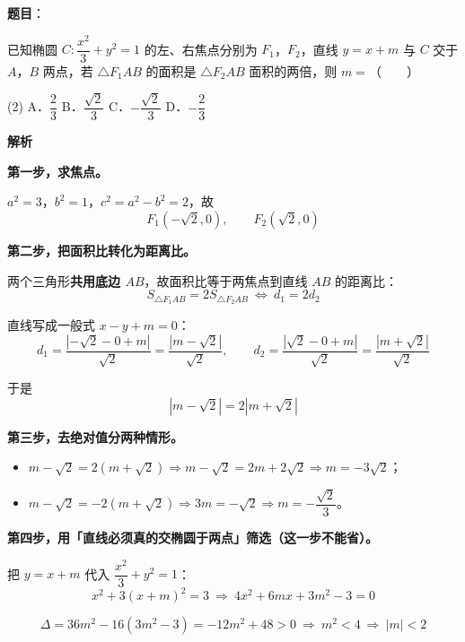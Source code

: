 \begin{answer}

\textbf{题目}：

已知椭圆 $C:\dfrac{x^{2}}3+y^{2}=1$ 的左、右焦点分别为 $F_1$，$F_2$，直线 $y=x+m$ 与 $C$ 交于 $A$，$B$ 两点，若 $\triangle F_1AB$ 的面积是 $\triangle F_2AB$ 面积的两倍，则 $m=$\mbox{（　　）}

\begin{gkopts}(2)
\task A．$\dfrac23$
\task B．$\dfrac{\sqrt2}3$
\task C．$-\dfrac{\sqrt2}3$
\task D．$-\dfrac23$
\end{gkopts}

\textbf{解析}

\textbf{第一步，求焦点。}

$a^{2}=3$，$b^{2}=1$，$c^{2}=a^{2}-b^{2}=2$，故
\nopagebreak[4]
\[F_1\left(-\sqrt2,0\right),\qquad F_2\left(\sqrt2,0\right)\]

\textbf{第二步，把面积比转化为距离比。}

两个三角形\textbf{共用底边 $AB$}，故面积比等于两焦点到直线 $AB$ 的距离比：
\nopagebreak[4]
\[S_{\triangle F_1AB}=2S_{\triangle F_2AB}\ \iff\ d_1=2d_2\]

直线写成一般式 $x-y+m=0$：
\nopagebreak[4]
\[d_1=\frac{\left|-\sqrt2-0+m\right|}{\sqrt2}=\frac{\left|m-\sqrt2\right|}{\sqrt2},\qquad d_2=\frac{\left|\sqrt2-0+m\right|}{\sqrt2}=\frac{\left|m+\sqrt2\right|}{\sqrt2}\]

于是
\nopagebreak[4]
\[\left|m-\sqrt2\right|=2\left|m+\sqrt2\right|\]

\textbf{第三步，去绝对值分两种情形。}

\begin{itemize}
\item $m-\sqrt2=2\left(m+\sqrt2\right)\Rightarrow m-\sqrt2=2m+2\sqrt2\Rightarrow m=-3\sqrt2$；
\item $m-\sqrt2=-2\left(m+\sqrt2\right)\Rightarrow 3m=-\sqrt2\Rightarrow m=-\dfrac{\sqrt2}3$。
\end{itemize}

\textbf{第四步，用「直线必须真的交椭圆于两点」筛选（这一步不能省）。}

把 $y=x+m$ 代入 $\dfrac{x^{2}}3+y^{2}=1$：
\nopagebreak[4]
\[x^{2}+3(x+m)^{2}=3\ \Longrightarrow\ 4x^{2}+6mx+3m^{2}-3=0\]

\nopagebreak[4]
\[\Delta=36m^{2}-16\left(3m^{2}-3\right)=-12m^{2}+48>0\ \Longrightarrow\ m^{2}<4\ \Longrightarrow\ |m|<2\]


\end{answer}
